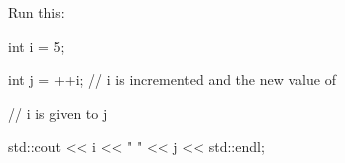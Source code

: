  Run this:

\begin{console}

int i = 5;

int j = ++i; // i is incremented and the new value of 

             // i is given to j

std::cout << i << " " << j << std::endl;

\end{console}

